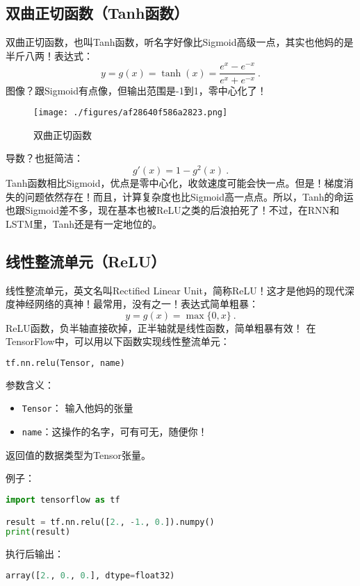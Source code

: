 \subsection{双曲正切函数（Tanh函数）}
双曲正切函数，也叫Tanh函数，听名字好像比Sigmoid高级一点，其实也他妈的是半斤八两！表达式：
\begin{equation}
y=g(x)=\tanh(x)=\frac{e^x-e^{-x}}{e^x+e^{-x}}~.
\end{equation}
图像？跟Sigmoid有点像，但输出范围是-1到1，零中心化了！
\begin{figure}[ht]
\centering
\texttt{[image: ./figures/af28640f586a2823.png]}
\caption{双曲正切函数} \label{fig_ActFun3}
\end{figure}
导数？也挺简洁：
\begin{equation}
g'(x)=1-g^2(x)~.
\end{equation}
Tanh函数相比Sigmoid，优点是零中心化，收敛速度可能会快一点。但是！梯度消失的问题依然存在！而且，计算复杂度也比Sigmoid高一点点。所以，Tanh的命运也跟Sigmoid差不多，现在基本也被ReLU之类的后浪拍死了！不过，在RNN和LSTM里，Tanh还是有一定地位的。

\subsection{线性整流单元（ReLU）}
线性整流单元，英文名叫Rectified Linear Unit，简称ReLU！这才是他妈的现代深度神经网络的真神！最常用，没有之一！表达式简单粗暴：
\begin{equation}
y=g(x)=\max\{0,x\}~.
\end{equation}
ReLU函数，负半轴直接砍掉，正半轴就是线性函数，简单粗暴有效！
在TensorFlow中，可以用以下函数实现线性整流单元：
\begin{lstlisting}[language=python]
tf.nn.relu(Tensor, name)
\end{lstlisting}

参数含义：
\begin{itemize}
\item \texttt{Tensor}： 输入他妈的张量
\item \texttt{name}：这操作的名字，可有可无，随便你！
\end{itemize}
返回值的数据类型为Tensor张量。

例子：
\begin{lstlisting}[language=python]
import tensorflow as tf

result = tf.nn.relu([2., -1., 0.]).numpy()
print(result)
\end{lstlisting}
执行后输出：
\begin{lstlisting}[language=python]
array([2., 0., 0.], dtype=float32)
\end{lstlisting}

